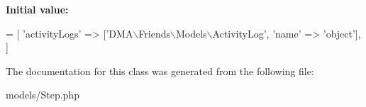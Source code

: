 {\bfseries Initial value\+:}
\begin{DoxyCode}
= [ 
        \textcolor{stringliteral}{'activityLogs'}  => [\textcolor{stringliteral}{'DMA\(\backslash\)Friends\(\backslash\)Models\(\backslash\)ActivityLog'}, \textcolor{stringliteral}{'name'} => \textcolor{stringliteral}{'object'}],
    ]
\end{DoxyCode}


The documentation for this class was generated from the following file\+:\begin{DoxyCompactItemize}
\item 
models/Step.\+php\end{DoxyCompactItemize}
